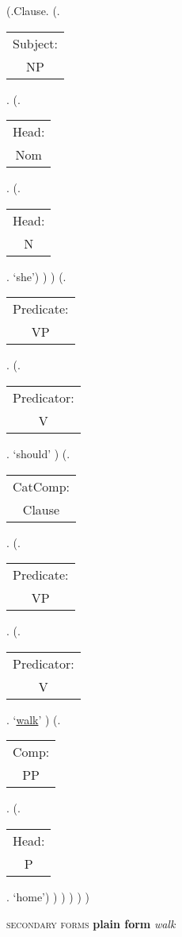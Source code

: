 \documentclass[12pt,letterpaper]{article}
\begin{document}
\begin{figure}
	\begin{center}
		\begin{parsetree}
			(.Clause.
			(.\begin{tabular}{c}Subject:\\NP\end{tabular}.  
			(.\begin{tabular}{c}Head:\\Nom\end{tabular}.
			(.\begin{tabular}{c}Head:\\N\end{tabular}. `she')
			)
			)
			(.\begin{tabular}{c}Predicate:\\VP\end{tabular}.
			(.\begin{tabular}{c}Predicator:\\V\end{tabular}.    `should' )
			(.\begin{tabular}{c}CatComp:\\Clause\end{tabular}. 
			(.\begin{tabular}{c}Predicate:\\VP\end{tabular}.
			(.\begin{tabular}{c}Predicator:\\V\end{tabular}.    `\underline{walk}' )
			(.\begin{tabular}{c}Comp:\\PP\end{tabular}. 
			(.\begin{tabular}{c}Head:\\P\end{tabular}. `home')
			)
			)
			)
			)
			) 
			
		\end{parsetree}
		\hfill \break \hfill {} \textsc{secondary forms} \textbf{plain form} \textit{walk}
	\end{center}
\end{figure}
\end{document}
